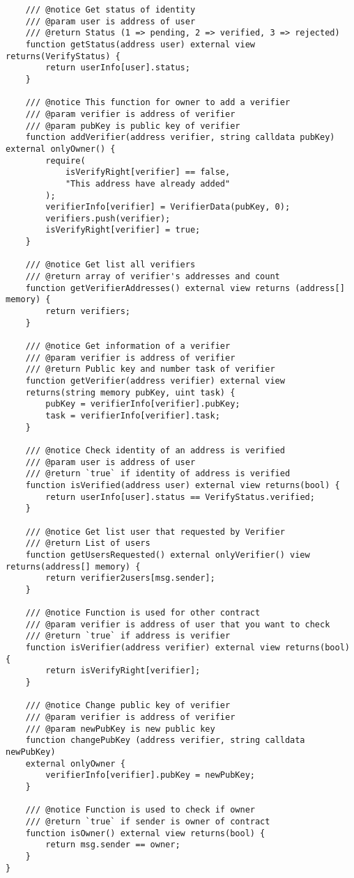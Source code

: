 \documentclass[../main-report.tex]{subfiles}
\begin{document}
\begin{lstlisting}
    /// @notice Get status of identity
    /// @param user is address of user
    /// @return Status (1 => pending, 2 => verified, 3 => rejected)
    function getStatus(address user) external view returns(VerifyStatus) {
        return userInfo[user].status;
    }

    /// @notice This function for owner to add a verifier
    /// @param verifier is address of verifier
    /// @param pubKey is public key of verifier
    function addVerifier(address verifier, string calldata pubKey) external onlyOwner() {
        require(
            isVerifyRight[verifier] == false,
            "This address have already added"
        );
        verifierInfo[verifier] = VerifierData(pubKey, 0);
        verifiers.push(verifier);
        isVerifyRight[verifier] = true;
    }

    /// @notice Get list all verifiers
    /// @return array of verifier's addresses and count
    function getVerifierAddresses() external view returns (address[] memory) {
        return verifiers;
    }

    /// @notice Get information of a verifier
    /// @param verifier is address of verifier
    /// @return Public key and number task of verifier
    function getVerifier(address verifier) external view
    returns(string memory pubKey, uint task) {
        pubKey = verifierInfo[verifier].pubKey;
        task = verifierInfo[verifier].task;
    }

    /// @notice Check identity of an address is verified
    /// @param user is address of user
    /// @return `true` if identity of address is verified
    function isVerified(address user) external view returns(bool) {
        return userInfo[user].status == VerifyStatus.verified;
    }

    /// @notice Get list user that requested by Verifier
    /// @return List of users
    function getUsersRequested() external onlyVerifier() view returns(address[] memory) {
        return verifier2users[msg.sender];
    }

    /// @notice Function is used for other contract
    /// @param verifier is address of user that you want to check
    /// @return `true` if address is verifier
    function isVerifier(address verifier) external view returns(bool) {
        return isVerifyRight[verifier];
    }

    /// @notice Change public key of verifier
    /// @param verifier is address of verifier
    /// @param newPubKey is new public key
    function changePubKey (address verifier, string calldata newPubKey)
    external onlyOwner {
        verifierInfo[verifier].pubKey = newPubKey;
    }

    /// @notice Function is used to check if owner
    /// @return `true` if sender is owner of contract
    function isOwner() external view returns(bool) {
        return msg.sender == owner;
    }
}
\end{lstlisting}
\end{document}
